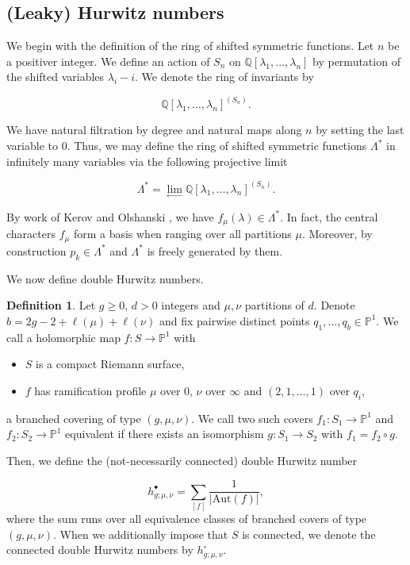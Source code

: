 \documentclass[10pt,a4paper,oneside,no-math,reqno]{amsart}%
\theoremstyle{plain}
\theoremstyle{definition}
\newtheorem{definition}[theorem]{Definition}
\theoremstyle{remark}
\numberwithin{equation}{section}
\newcommand{\1}{\mathds{1}}
\newcommand{\<}{\langle}
\renewcommand{\>}{\rangle}
\begin{document}
\subsection{(Leaky) Hurwitz numbers}
We begin with the definition of the ring of shifted symmetric functions. Let $n$ be a positiver integer. We define an action of $S_n$ on $\mathbb{Q}[\lambda_1,\dots,\lambda_n]$ by permutation of the shifted variables $\lambda_i-i$. We denote the ring of invariants by

\begin{equation}
    \mathbb{Q}[\lambda_1,\dots,\lambda_n]^{(S_n)}.
\end{equation}

We have natural filtration by degree and natural maps along $n$ by setting the last variable to $0$. Thus, we may define the ring of shifted symmetric functions $\Lambda^\ast$ in infinitely many variables via the following projective limit

\begin{equation}
    \Lambda^\ast
    =
    \lim_{\leftarrow} \mathbb{Q}[\lambda_1,\dots,\lambda_n]^{(S_n)}.
\end{equation}


By work of Kerov and Olshanski \cite{Ker94}, we have $f_\mu(\lambda)\in\Lambda^\ast$. In fact, the central characters $f_\mu$ form a basis when ranging over all partitions $\mu$. Moreover, by construction $p_k\in\Lambda^\ast$ and $\Lambda^\ast$ is freely generated by them.


We now define double Hurwitz numbers.

\begin{definition}
Let $g\ge0$, $d>0$ integers and $\mu,\nu$ partitions of $d$. Denote $b=2g-2+\ell(\mu)+\ell(\nu)$ and fix pairwise distinct points $q_1,\dots,q_b\in\mathbb{P}^1$. We call a holomorphic map $f\colon S\to\mathbb{P}^1$ with
\begin{itemize}
    \item $S$ is a compact Riemann surface,
    \item $f$ has ramification profile $\mu$ over $0$, $\nu$ over $\infty$ and $(2,1,\dots,1)$ over $q_i$,
\end{itemize}
a branched covering of type $(g,\mu,\nu)$. We call two such covers $f_1\colon S_1\to\mathbb{P}^1$ and $f_2\colon S_2\to\mathbb{P}^1$ equivalent if there exists an isomorphism $g\colon S_1\to S_2$ with $f_1=f_2\circ g$.

Then, we define the (not-necessarily connected) double Hurwitz number

\begin{equation}
    h^\bullet_{g;\mu,\nu}
    =
    \sum_{[f]} \frac{1}{|\mathrm{Aut}(f)|},
\end{equation}
where the sum runs over all equivalence classes of branched covers of type $(g,\mu,\nu)$. When we additionally impose that $S$ is connected, we denote the connected double Hurwitz numbers by $h^\circ_{g;\mu,\nu}$.
\end{definition}
\end{document}
